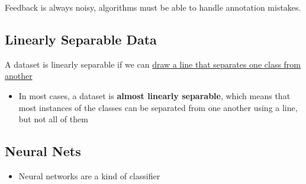     Feedback is always noisy, algorithms must be able to handle annotation
    mistakes.

  \subsection{Linearly Separable Data}

    A dataset is linearly separable if we can \ul{draw a line that separates
    one class from another}

    \begin{itemize}
      \item In most cases, a dataset is \textbf{almost linearly separable},
      which means that most instances of the classes can be separated from
      one another using a line, but not all of them
    \end{itemize}

  \subsection{Neural Nets}

    \begin{itemize}
      \item Neural networks are a kind of classifier
    \end{itemize}